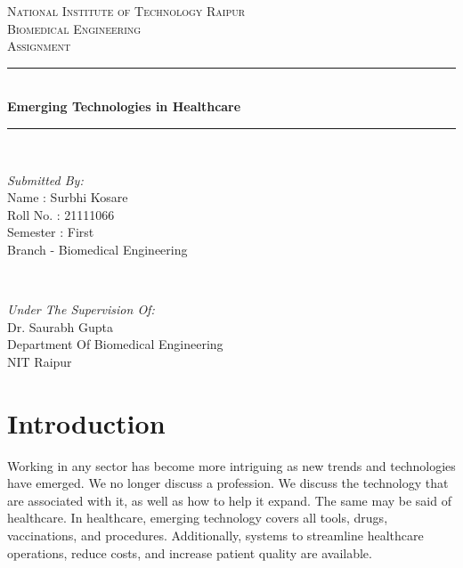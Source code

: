 \documentclass[12pt]{article}
\begin{document}
\begin{titlepage}
\newcommand{\HRule}{\rule{\linewidth}{0.5mm}}
\center
\textsc{\LARGE National Institute of Technology Raipur}\\[1.0cm]

\textsc{\Large Biomedical Engineering}\\[0.5cm] 
\textsc{\large Assignment}\\[0.5cm]
\HRule\\[0.4cm]
	
	{\huge\bfseries   Emerging Technologies in Healthcare}\\[0.1cm]
	\HRule\\[1.1cm]
	\begin{minipage}{0.4\textwidth}
		\begin{flushleft}
			\large
			\textit{Submitted By:}\\
          		Name : Surbhi Kosare \\
			   Roll No. : 21111066\\
			   Semester : First\\
			   Branch - Biomedical Engineering 
			   
			\end{flushleft}
	\end{minipage}
	~
	\begin{minipage}{0.5\textwidth}
		\begin{flushright}
			\large
			\textit{Under The Supervision Of:}\\
			Dr. Saurabh Gupta\\
			Department Of Biomedical Engineering\\
			NIT Raipur
		\end{flushright}
	\end{minipage}
	\vfill\vfill\vfill 
	
	
	\vfill 
\end{titlepage}

\section{Introduction}
Working in any sector has become more intriguing as new trends and technologies have emerged. We no longer discuss a profession. We discuss the technology that are associated with it, as well as how to help it expand. The same may be said of healthcare. In healthcare, emerging technology covers all tools, drugs, vaccinations, and procedures. Additionally, systems to streamline healthcare operations, reduce costs, and increase patient quality are available.
\end{document}
